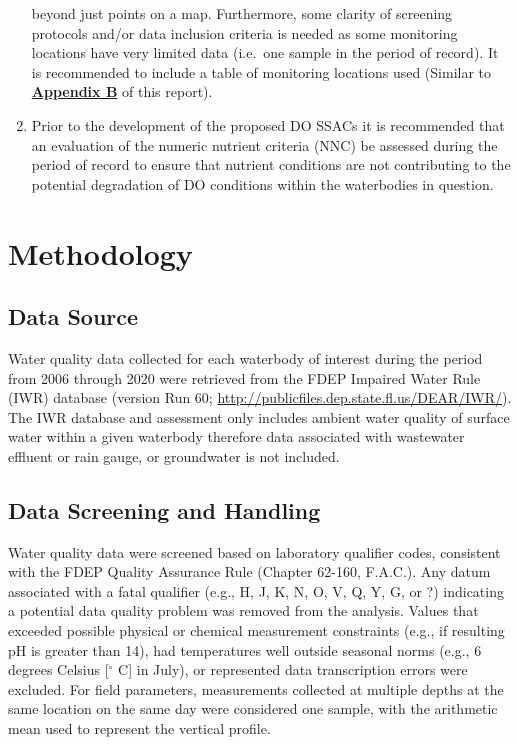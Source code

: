 \documentclass[]{interact}
\theoremstyle{plain}%
\theoremstyle{definition}
\theoremstyle{remark}
\begin{document}
\begin{enumerate}
  beyond just points on a map. Furthermore, some clarity of screening
  protocols and/or data inclusion criteria is needed as some monitoring
  locations have very limited data (i.e.~one sample in the period of
  record). It is recommended to include a table of monitoring locations
  used (Similar to \textbf{\protect\hyperlink{appendix-b}{Appendix B}}
  of this report).
\item
  Prior to the development of the proposed DO SSACs it is recommended
  that an evaluation of the numeric nutrient criteria (NNC) be assessed
  during the period of record to ensure that nutrient conditions are not
  contributing to the potential degradation of DO conditions within the
  waterbodies in question.
\end{enumerate}

\hypertarget{methodology}{%
\section{Methodology}\label{methodology}}

\hypertarget{data-source}{%
\subsection{Data Source}\label{data-source}}

Water quality data collected for each waterbody of interest during the
period from 2006 through 2020 were retrieved from the FDEP Impaired
Water Rule (IWR) database (version Run 60;
\url{http://publicfiles.dep.state.fl.us/DEAR/IWR/}). The IWR database
and assessment only includes ambient water quality of surface water
within a given waterbody therefore data associated with wastewater
effluent or rain gauge, or groundwater is not included.

\hypertarget{data-screening-and-handling}{%
\subsection{Data Screening and
Handling}\label{data-screening-and-handling}}

Water quality data were screened based on laboratory qualifier codes,
consistent with the FDEP Quality Assurance Rule (Chapter 62-160,
F.A.C.). Any datum associated with a fatal qualifier (e.g., H, J, K, N,
O, V, Q, Y, G, or ?) indicating a potential data quality problem was
removed from the analysis. Values that exceeded possible physical or
chemical measurement constraints (e.g., if resulting pH is greater than
14), had temperatures well outside seasonal norms (e.g., 6 degrees
Celsius {[}\(^\circ\) C{]} in July), or represented data transcription
errors were excluded. For field parameters, measurements collected at
multiple depths at the same location on the same day were considered one
sample, with the arithmetic mean used to represent the vertical profile.
\end{document}
